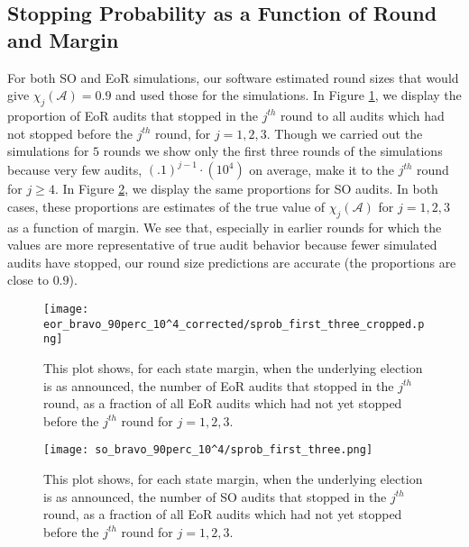 \subsection{Stopping Probability as a Function of Round and Margin}
For both SO and EoR \BRAVO simulations, our software estimated round sizes that would give $\chi_j(\mathcal{A}) = 0.9$ and used those for the simulations. In Figure \ref{fig:eor_bravo_sprob}, we display the proportion of EoR \BRAVO audits that stopped in the $j^{th}$ round
to all audits which had not stopped before the $j^{th}$ round, for $j=1,2,3$. Though we carried out the simulations for $5$ rounds we show only the first three rounds of the simulations because very few audits, $(.1)^{j-1}\cdot(10^4)$ on average, 
make it to the $j^{th}$ round for $j \geq 4$. In Figure \ref{fig:so_bravo_sprob}, we display the same proportions for SO \BRAVO audits. 
In both cases, these proportions are estimates of the true value of $\chi_j(\mathcal{A})$ for $j=1,2,3$ as a function of margin. 
We see that, especially in earlier rounds for which 
the values are more representative of true audit behavior because fewer simulated audits have stopped, 
our round size predictions are accurate (the proportions are close to $0.9$).

\begin{figure}
\begin{centering}
\texttt{[image: eor\_bravo\_90perc\_10^4\_corrected/sprob\_first\_three\_cropped.png]}\caption{
This plot shows, for each state margin, when the underlying election is as announced, the number of EoR \BRAVO audits that stopped in the $j^{th}$ round,
as a fraction of all EoR \BRAVO audits which had not yet stopped before the $j^{th}$ round for $j=1,2,3$.}
\label{fig:eor_bravo_sprob}
\end{centering}
\end{figure}

\begin{figure}
\begin{centering}
\texttt{[image: so\_bravo\_90perc\_10^4/sprob\_first\_three.png]}\caption{
This plot shows, for each state margin, when the underlying election is as announced, the number of SO \BRAVO audits that stopped in the $j^{th}$ round,
as a fraction of all EoR \BRAVO audits which had not yet stopped before the $j^{th}$ round for $j=1,2,3$.}
\label{fig:so_bravo_sprob}
\end{centering}
\end{figure}

